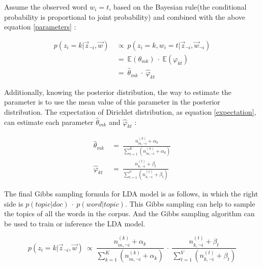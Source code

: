 Assume the observed word $w_i=t$, based on the Bayesian rule(the conditional probability is proportional to joint probability) and combined with the above equation \ref{parameters} \cite{heinrich2005parameter}:

\begin{equation}
\begin{aligned}
    p(z_i=k|\vec z_{\lnot i},\vec w)\ &\propto\ p(z_i=k,w_i=t|\vec z_{\lnot i},\vec w_{\lnot i})\\
    &=\ \mathbb{E}(\theta_{mk})\ \cdot\ \mathbb{E}(\varphi_{kt})\\
    &=\ \hat{\theta}_{mk}\ \cdot\ \hat{\varphi}_{kt}
\end{aligned}
\end{equation}

Additionally, knowing the posterior distribution, the way to estimate the parameter is to use the mean value of this parameter in the posterior distribution. The expectation of Dirichlet distribution, as equation \ref{expectation}, can estimate each parameter $\hat{\theta}_{mk}$ and $\hat{\varphi}_{kt}$ \cite{heinrich2005parameter}:

\begin{equation}
\begin{split}
    \hat{\theta}_{mk}\ &=\ \frac{n_{m,\lnot i}^{(k)}+\alpha_k}{\sum_{k=1}^{K}(n_{m,\lnot i}^{(k)}+\alpha_k)}\\
    \hat{\varphi}_{kt}\ &=\ \frac{n_{k,\lnot i}^{(t)}+\beta_t}{\sum_{t=1}^{V}(n_{k,\lnot i}^{(t)}+\beta_t)}
\end{split}
\end{equation}

The final Gibbs sampling formula for LDA model is as follows, in which the right side is $p(topic|doc)\ \cdot\ p(word|topic)$. This Gibbs sampling can help to sample the topics of all the words in the corpus. And the Gibbs sampling algorithm can be used to train or inference the LDA model.

\begin{equation}
    p(z_i=k|\vec z_{\lnot i},\vec w)\ \propto\ \frac{n_{m,\lnot i}^{(k)}+\alpha_k}{\sum_{k=1}^{K}(n_{m,\lnot i}^{(k)}+\alpha_k)}\ \cdot\ \frac{n_{k,\lnot i}^{(t)}+\beta_t}{\sum_{t=1}^{V}(n_{k,\lnot i}^{(t)}+\beta_t)}
\end{equation}


